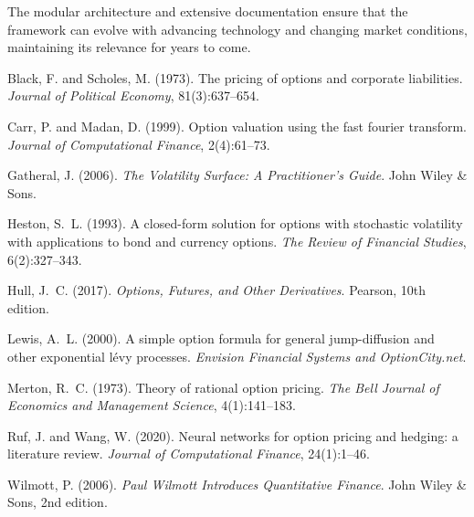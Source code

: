 \documentclass[12pt,a4paper]{article}
\begin{document}
The modular architecture and extensive documentation ensure that the framework can evolve with advancing technology and changing market conditions, maintaining its relevance for years to come.


\begin{thebibliography}{}

Black, F. and Scholes, M. (1973).
\newblock The pricing of options and corporate liabilities.
\newblock \emph{Journal of Political Economy}, 81(3):637--654.

Carr, P. and Madan, D. (1999).
\newblock Option valuation using the fast fourier transform.
\newblock \emph{Journal of Computational Finance}, 2(4):61--73.

Gatheral, J. (2006).
\newblock \emph{The Volatility Surface: A Practitioner's Guide}.
\newblock John Wiley \& Sons.

Heston, S.~L. (1993).
\newblock A closed-form solution for options with stochastic volatility with applications to bond and currency options.
\newblock \emph{The Review of Financial Studies}, 6(2):327--343.

Hull, J.~C. (2017).
\newblock \emph{Options, Futures, and Other Derivatives}.
\newblock Pearson, 10th edition.

Lewis, A.~L. (2000).
\newblock A simple option formula for general jump-diffusion and other exponential l\'{e}vy processes.
\newblock \emph{Envision Financial Systems and OptionCity.net}.

Merton, R.~C. (1973).
\newblock Theory of rational option pricing.
\newblock \emph{The Bell Journal of Economics and Management Science}, 4(1):141--183.

Ruf, J. and Wang, W. (2020).
\newblock Neural networks for option pricing and hedging: a literature review.
\newblock \emph{Journal of Computational Finance}, 24(1):1--46.

Wilmott, P. (2006).
\newblock \emph{Paul Wilmott Introduces Quantitative Finance}.
\newblock John Wiley \& Sons, 2nd edition.

\end{thebibliography}
\end{document}
